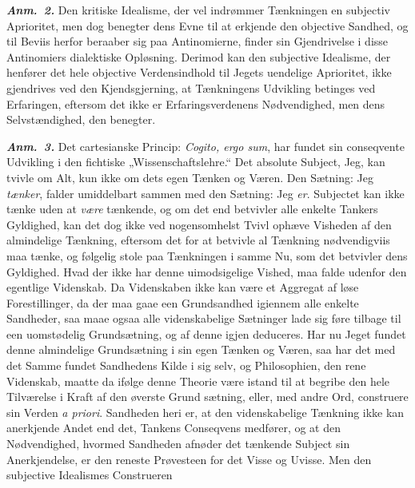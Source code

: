 \documentclass[12pt]{book}
\newcommand{\anm}[1]{\emph{\textbf{Anm.~#1.}}}
\newcommand{\opage}[1]{\marginnote{\footnotesize\textit{[#1]}}}
\begin{document}
\anm{2} Den kritiske Idealisme, der vel indrømmer
\opage{22} Tænkningen en subjectiv Aprioritet, men dog benegter dens Evne til at erkjende
den objective Sandhed, og til Beviis herfor beraaber sig paa Antinomierne,
finder sin Gjendrivelse i disse Antinomiers dialektiske Opløsning. Derimod kan
den subjective Idealisme, der henfører det hele objective Verdensindhold til
Jegets uendelige Aprioritet, ikke gjendrives ved den Kjendsgjerning, at
Tænkningens Udvikling betinges ved Erfaringen, eftersom det ikke er
Erfaringsverdenens Nødvendighed, men dens Selvstændighed, den benegter.

\anm{3} Det cartesianske Princip: \textit{Cogito, ergo sum}, har fundet sin
conseqvente Udvikling i den fichtiske „Wissenschaftslehre.“ Det absolute
Subject, Jeg, kan tvivle om Alt, kun ikke om dets egen Tænken og Væren. Den
Sætning: Jeg \emph{tænker}, falder umiddelbart sammen med den Sætning: Jeg
\emph{er}. Subjectet kan ikke tænke uden at \emph{være} tænkende, og om det
end betvivler alle enkelte Tankers Gyldighed, kan det dog ikke ved
nogensomhelst Tvivl ophæve Visheden af den almindelige Tænkning, eftersom det
for at betvivle al Tænkning nødvendigviis maa tænke, og følgelig stole paa
Tænkningen i samme Nu, som det betvivler dens Gyldighed. Hvad der ikke har
denne uimodsigelige Vished, maa falde udenfor den egentlige Videnskab. Da
Videnskaben ikke kan være et Aggregat af løse Forestillinger, da der maa gaae
een Grundsandhed igiennem alle enkelte Sandheder, saa maae ogsaa alle
videnskabelige Sætninger lade sig føre tilbage til een uomstødelig
Grundsætning, og af denne igjen deduceres. Har nu Jeget fundet denne
almindelige Grundsætning i sin egen Tænken og Væren, saa har det med det Samme
fundet Sandhedens Kilde i sig selv, og Philosophien, den rene Videnskab,
maatte da ifølge denne Theorie være istand til at begribe den hele Tilværelse
i Kraft af den øverste Grund%
\opage{23}sætning, eller, med andre Ord, construere sin Verden \textit{a priori}.
Sandheden heri er, at den videnskabelige Tænkning ikke kan anerkjende Andet
end det, Tankens Conseqvens medfører, og at den Nødvendighed, hvormed
Sandheden afnøder det tænkende Subject sin Anerkjendelse, er den reneste
Prøvesteen for det Visse og Uvisse. Men den subjective Idealismes Construeren
\end{document}
